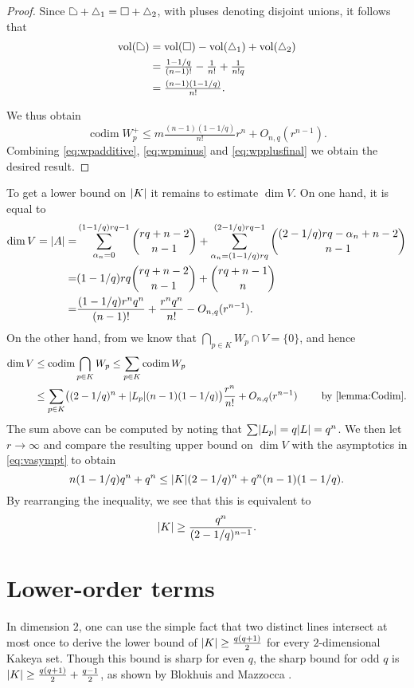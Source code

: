 \documentclass{daj}
\theoremstyle{definition}
\DeclarePairedDelimiter\abs{\lvert}{\rvert}                     %
\newcommand*{\polytope}{\mskip1mu\tikz{\draw (0,0)--(0,1.5ex)-- (0.7ex,1.5ex) -- (1.5ex,0.7ex)--(1.5ex,0)--cycle;}\mskip1mu}
\newcommand*{\squarepolytope}{\mskip1mu\tikz{\draw (0,0)--(0,1.5ex)--(1.5ex,1.5ex)--(1.5ex,0)--cycle;}\mskip1mu}
\newcommand*{\simplex}{\mskip1mu\tikz{\draw (0,0)--(0.75ex,1.5ex)--(1.5ex,0)--cycle;}\mskip1mu}
\newcommand*{\simplexone}{\simplex_1}
\newcommand*{\simplextwo}{\simplex_2}
\DeclareMathOperator{\vol}{vol}                                %
\DeclareMathOperator{\codim}{codim}                            %
\begin{document}
\begin{proof}
Since $\polytope+\simplexone=\squarepolytope+\simplextwo$, with pluses denoting disjoint unions, it follows that
\begin{align*}
  \vol(\polytope)&=\vol(\squarepolytope)-\vol(\simplexone)+\vol(\simplextwo)\\
  &=\tfrac{1-1/q}{(n-1)!}-\tfrac{1}{n!}+\tfrac{1}{n!q}\\
  &=\tfrac{(n-1)(1-1/q)}{n!}.
\end{align*}

We thus obtain
\begin{equation}\label{eq:wpplusfinal}
  \codim W_p^{+}\leq m\tfrac{(n-1)(1-1/q)}{n!}r^n+O_{n,q}(r^{n-1}).
\end{equation}
Combining \eqref{eq:wpadditive}, \eqref{eq:wpminus} and \eqref{eq:wpplusfinal} we obtain the desired result.
\end{proof}


To get a lower bound on $\abs{K}$ it remains to estimate $\dim V$. On one hand, it is equal to
\begin{align}
\dim V=\abs{A}=&\sum_{\alpha_n=0}^{(1-1/q)rq-1}\binom{rq+n-2}{n-1}+\sum_{\alpha_n=(1-1/q)rq}^{(2-1/q)rq-1}\binom{(2-1/q)rq-\alpha_n+n-2}{n-1} \notag\\
=&(1-1/q)rq\binom{rq+n-2}{n-1}+\binom{rq+n-1}{n} \notag\\
=&\frac{(1-1/q)r^nq^n}{(n-1)!}+\frac{r^nq^n}{n!}-O_{n,q}(r^{n-1}).\label{eq:vasympt}
\end{align}
On the other hand, from  we know that $\bigcap_{p\in K}W_p\cap V=\{0\}$, and hence
\begin{align*}
  \dim V&\leq \codim \bigcap_{p\in K}W_p\leq \sum_{p\in K}\codim W_p\\&\leq \sum_{p\in K}\bigl((2-1/q)^n+\abs{L_p}(n-1)(1-1/q)\bigr)\frac{r^n}{n!}+O_{n,q}(r^{n-1})\qquad\text{ by \Cref{lemma:Codim}}.
\end{align*}
The sum above can be computed by noting that $\sum \abs{L_p}=q\abs{L}=q^n$. We then let $r\to\infty$ and compare the resulting upper bound on $\dim V$ with the asymptotics in \eqref{eq:vasympt}
to obtain
\[
 n(1-1/q)q^n+q^n\leq \abs{K}(2-1/q)^n+q^n(n-1)(1-1/q).
\]
By rearranging the inequality, we see that this is equivalent to
\[
  \abs{K}\geq \frac{q^n}{(2-1/q)^{n-1}}.
\]

\section{Lower-order terms}\label{sec:problem}
In dimension $2$, one can use
the simple fact that two distinct lines intersect at most
once to derive the lower bound of $\abs{K}\geq \frac{q(q+1)}{2}$
for every $2$-dimensional Kakeya set. Though this bound is sharp
for even $q$, the sharp bound for odd $q$ is $\abs{K}\geq \frac{q(q+1)}{2}+\frac{q-1}{2}$,
as shown by Blokhuis and Mazzocca \cite{blokhuis_mazzocca}.
\end{document}
